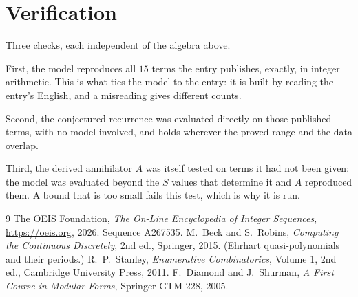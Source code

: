 \documentclass[11pt,a4paper]{article}
\theoremstyle{plain}
\theoremstyle{definition}
\begin{document}
\section{Verification}

Three checks, each independent of the algebra above.

First, the model reproduces all $15$ terms the entry publishes, exactly, in integer
arithmetic. This is what ties the model to the entry: it is built by reading the entry's
English, and a misreading gives different counts.

Second, the conjectured recurrence was evaluated directly on those published terms, with no
model involved, and holds wherever the proved range and the data overlap.

Third, the derived annihilator $A$ was itself tested on terms it had not been given: the model
was evaluated beyond the $S$ values that determine it and $A$ reproduced them. A bound that is
too small fails this test, which is why it is run.

\begin{thebibliography}{9}
 The OEIS Foundation, \emph{The On-Line Encyclopedia of Integer
Sequences}, \url{https://oeis.org}, 2026. Sequence A267535.
 M.~Beck and S.~Robins, \emph{Computing the Continuous Discretely},
2nd ed., Springer, 2015. (Ehrhart quasi-polynomials and their periods.)
 R.~P.~Stanley, \emph{Enumerative Combinatorics}, Volume 1, 2nd ed.,
Cambridge University Press, 2011.
 F.~Diamond and J.~Shurman, \emph{A First Course in Modular Forms},
Springer GTM 228, 2005.
\end{thebibliography}
\end{document}
